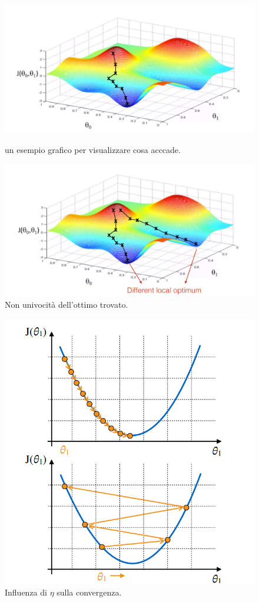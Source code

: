 \documentclass[10pt,oneside,a4paper]{article}
\begin{document}
\begin{figure}
  \includegraphics[width=\linewidth]{Images/gradientDescend.png}
  \caption{un esempio grafico per visualizzare cosa acccade.}
  \label{fig:1}
    \includegraphics[width=\linewidth]{Images/gradientDescend2.png}
  \caption{Non univocità dell'ottimo trovato.}
  \label{fig:2}
  \end{figure}
  \pagebreak
  \begin{figure}
    \includegraphics[width=\linewidth]{Images/learningRate.png}
  \caption{Influenza di $\eta$ sulla convergenza.}
  \label{fig:3}
\end{figure}
\pagebreak
\end{document}
